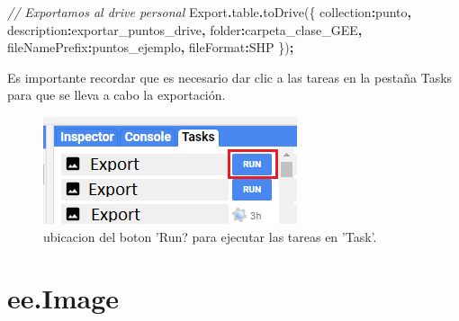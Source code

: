 \documentclass[
  12pt,
  letterpaper,
  twoside]{book}
\newenvironment{Shaded}{\begin{snugshade}}{\end{snugshade}}
\newcommand{\AttributeTok}[1]{\textcolor[rgb]{0.77,0.63,0.00}{#1}}
\newcommand{\CommentTok}[1]{\textcolor[rgb]{0.56,0.35,0.01}{\textit{#1}}}
\newcommand{\DataTypeTok}[1]{\textcolor[rgb]{0.13,0.29,0.53}{#1}}
\newcommand{\FunctionTok}[1]{\textcolor[rgb]{0.00,0.00,0.00}{#1}}
\newcommand{\NormalTok}[1]{#1}
\newcommand{\OperatorTok}[1]{\textcolor[rgb]{0.81,0.36,0.00}{\textbf{#1}}}
\newcommand{\StringTok}[1]{\textcolor[rgb]{0.31,0.60,0.02}{#1}}
\begin{document}
\begin{Shaded}
\begin{Highlighting}[]
\CommentTok{// Exportamos al drive personal}
\NormalTok{Export}\OperatorTok{.}\AttributeTok{table}\OperatorTok{.}\FunctionTok{toDrive}\NormalTok{(\{}
  \DataTypeTok{collection}\OperatorTok{:}\NormalTok{punto}\OperatorTok{,} 
  \DataTypeTok{description}\OperatorTok{:}\StringTok{\textquotesingle{}exportar\_puntos\_drive\textquotesingle{}}\OperatorTok{,}
  \DataTypeTok{folder}\OperatorTok{:}\StringTok{\textquotesingle{}carpeta\_clase\_GEE\textquotesingle{}}\OperatorTok{,}
  \DataTypeTok{fileNamePrefix}\OperatorTok{:}\StringTok{\textquotesingle{}puntos\_ejemplo\textquotesingle{}}\OperatorTok{,}
  \DataTypeTok{fileFormat}\OperatorTok{:}\StringTok{\textquotesingle{}SHP\textquotesingle{}}
\NormalTok{\})}\OperatorTok{;}
\end{Highlighting}
\end{Shaded}

Es importante recordar que es necesario dar clic a las tareas en la pestaña Tasks para que se lleva a cabo la exportación.

\begin{figure}[btp]

{\centering \includegraphics[width=1\linewidth]{Img/boton_run} 

}

\caption{ubicacion del boton 'Run? para ejecutar las tareas en 'Task'.}\label{fig:unnamed-chunk-107}
\end{figure}

\newpage

\hypertarget{ee.image-1}{%
\chapter{ee.Image}\label{ee.image-1}}
\end{document}
